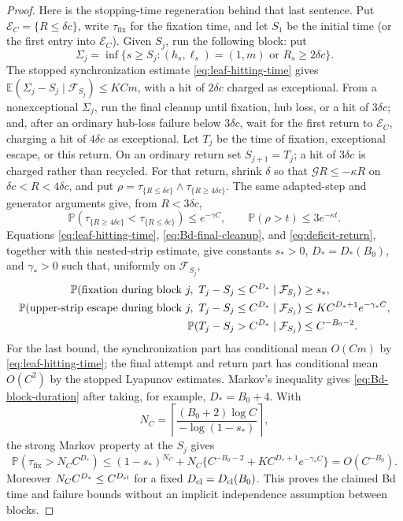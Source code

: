 \documentclass[11pt]{article}
\theoremstyle{definition}
\theoremstyle{remark}
\newcommand{\Prob}{\mathbb P}
\begin{document}
\begin{proof}
Here is the stopping-time regeneration behind that last sentence.  Put
$\mathcal E_C=\{R\leq\delta c\}$, write $\tau_{\mathrm{fix}}$ for the
fixation time, and let $S_1$ be the initial time (or the first entry into
$\mathcal E_C$).  Given $S_j$, run the following block:
put
\[
 \Sigma_j=\inf\{s\geq S_j:(h_s,\ell_s)=(1,m)
                         \text{ or }R_s\geq2\delta c\}.
\]
The stopped synchronization estimate \eqref{eq:leaf-hitting-time} gives
$\mathbb E(\Sigma_j-S_j\mid\mathcal F_{S_j})\leq K C m$, with a hit of
$2\delta c$ charged as exceptional.  From a nonexceptional $\Sigma_j$, run
the final cleanup until fixation, hub loss, or a hit of $3\delta c$;
and, after an ordinary hub-loss failure below $3\delta c$, wait for the
first return to $\mathcal E_C$, charging a hit of $4\delta c$ as exceptional.
Let $T_j$ be the time of fixation, exceptional escape, or this return.  On
an ordinary return set $S_{j+1}=T_j$; a hit of $3\delta c$ is charged rather
than recycled.  For that return, shrink $\delta$ so that
$\mathcal G R\leq-\kappa R$ on $\delta c<R<4\delta c$, and put
$\rho=\tau_{\{R\leq\delta c\}}\wedge\tau_{\{R\geq4\delta c\}}$.
The same adapted-step and generator arguments give, from $R<3\delta c$,
\[
 \Prob(\tau_{\{R\geq4\delta c\}}<\tau_{\{R\leq\delta c\}})
 \leq e^{-\gamma C},\qquad
 \Prob(\rho>t)\leq3e^{-\kappa t}.
\]
Equations
\eqref{eq:leaf-hitting-time}, \eqref{eq:Bd-final-cleanup}, and
\eqref{eq:deficit-return}, together with this nested-strip estimate, give
constants $s_*>0$, $D_*=D_*(B_0)$, and $\gamma_*>0$ such that, uniformly on
$\mathcal F_{S_j}$,
\begin{align}
 \Prob(\hbox{fixation during block }j,\ T_j-S_j\leq C^{D_*}
       \mid\mathcal F_{S_j})
 &\geq s_*,\label{eq:Bd-block-success}\\
 \Prob(\hbox{upper-strip escape during block }j,
       \ T_j-S_j\leq C^{D_*}\mid\mathcal F_{S_j})
 &\leq K C^{D_*+1}e^{-\gamma_*C},\label{eq:Bd-block-escape}\\
 \Prob(T_j-S_j>C^{D_*}\mid\mathcal F_{S_j})
 &\leq C^{-B_0-2}.
 \label{eq:Bd-block-duration}
\end{align}
For the last bound, the synchronization part has conditional mean $O(Cm)$
by \eqref{eq:leaf-hitting-time}; the final attempt and return part has
conditional mean $O(C^2)$ by the stopped Lyapunov estimates.  Markov's
inequality gives \eqref{eq:Bd-block-duration} after taking, for example,
$D_*=B_0+4$.  With
\[
 N_C=\left\lceil
 \frac{(B_0+2)\log C}{-\log(1-s_*)}\right\rceil,
\]
the strong Markov property at the $S_j$ gives
\[
 \Prob(\tau_{\mathrm{fix}}>N_CC^{D_*})
 \leq(1-s_*)^{N_C}
   +N_C\{C^{-B_0-2}+K C^{D_*+1}e^{-\gamma_*C}\}
 =O(C^{-B_0}).
\]
Moreover $N_CC^{D_*}\leq C^{D_{\rm cl}}$ for a fixed
$D_{\rm cl}=D_{\rm cl}(B_0)$.  This proves the
claimed Bd time and failure bounds without an implicit independence
assumption between blocks.


\end{proof}
\end{document}
